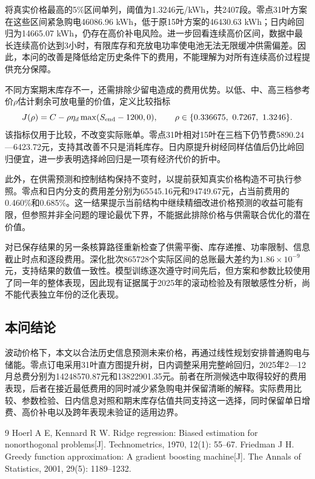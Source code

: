 \documentclass[11pt,a4paper]{article}
\begin{document}
将真实价格最高的5\%区间单列，阈值为1.3246元/kWh，共2407段。零点31叶方案在这些区间紧急购电46086.96 kWh，低于原15叶方案的46430.63 kWh；日内岭回归为14665.07 kWh，仍存在高价补电风险。进一步回看连续高价区间，数据中最长连续高价达到3小时，有限库存和充放电功率使电池无法无限缓冲供需偏差。因此，本问的改善是降低给定历史条件下的费用，不能理解为对所有连续高价过程提供充分保障。

不同方案期末库存不一，还需排除少留电造成的费用优势。以低、中、高三档参考价$\rho$估计剩余可放电量的价值，定义比较指标
\begin{equation}
 J(\rho)=C-\rho\eta_d\max(S_{\rm end}-1200,0),\qquad
 \rho\in\{0.336675,\ 0.7267,\ 1.3246\}.
\end{equation}
该指标仅用于比较，不改变实际账单。零点31叶相对15叶在三档下仍节费5890.24—6423.72元，支持其改善不只是消耗库存。日内原提升树经同样估值后仍比岭回归便宜，进一步表明选择岭回归是一项有经济代价的折中。

此外，在供需预测和控制结构保持不变时，以提前获知真实价格构造不可执行参照。零点和日内分支的费用差分别为65545.16元和94749.67元，占当前费用的0.460\%和0.685\%。这一结果提示当前结构中继续精细改进价格预测的收益可能有限，但参照并非全问题的理论最优下界，不能据此排除价格与供需联合优化的潜在价值。

对已保存结果的另一条核算路径重新检查了供需平衡、库存递推、功率限制、信息截止时点和逐段费用。深化批次865728个实际区间的总账最大差约为$1.86\times10^{-9}$元，支持结果的数值一致性。模型训练逐次遵守时间先后，但方案和参数比较使用了同一年的整体表现，因此现有证据属于2025年的滚动检验及有限敏感性分析，尚不能代表独立年份的泛化表现。

\subsection{本问结论}

波动价格下，本文以合法历史信息预测未来价格，再通过线性规划安排普通购电与储能。零点订电采用31叶直方图提升树，日内调整采用完整岭回归，2025年2—12月总费分别为14248570.87元和13822901.35元。前者在所测候选中取得较好的费用表现，后者在接近最低费用的同时减少紧急购电并保留清晰的解释。实际费用比较、参数检验、日内信息对照和期末库存估值共同支持这一选择，同时保留单日增费、高价补电以及跨年表现未验证的适用边界。

\begin{thebibliography}{9}
 Hoerl A E, Kennard R W. Ridge regression: Biased estimation for nonorthogonal problems[J]. Technometrics, 1970, 12(1): 55--67.
 Friedman J H. Greedy function approximation: A gradient boosting machine[J]. The Annals of Statistics, 2001, 29(5): 1189--1232.
\end{thebibliography}
\end{document}
